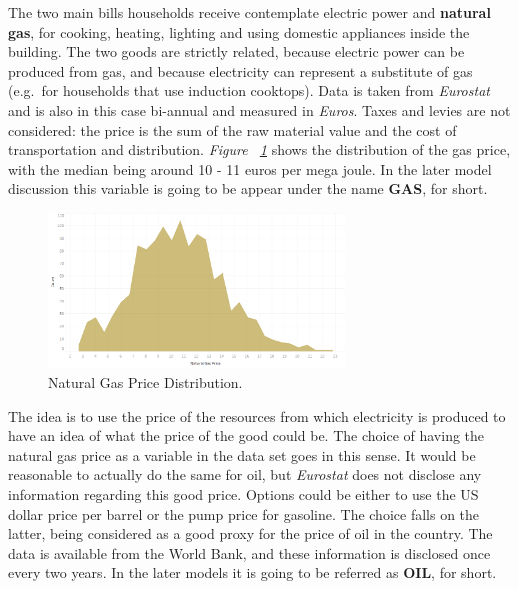 \documentclass[a4paper,12pt]{book}
\begin{document}
The two main bills households receive contemplate electric power and \textbf{natural gas}, for cooking, heating, lighting and using domestic appliances inside the building. The two goods are strictly related, because electric power can be produced from gas, and because electricity can represent a substitute of gas (e.g.\ for households that use induction cooktops). Data is taken from \textit{Eurostat} and is also in this case bi-annual and measured in \textit{Euros}. Taxes and levies are not considered: the price is the sum of the raw material value and the cost of transportation and distribution. \textit{Figure ~\ref{fig:ngpd}} shows the distribution of the gas price, with the median being around 10 - 11 euros per mega joule. In the later model discussion this variable is going to be appear under the name \textbf{GAS}, for short.

\begin{figure}[tb]
\begin{center}
\captionsetup{justification=centering}
\includegraphics[width=0.7\textwidth]{Images/nGas.png}
\caption{Natural Gas Price Distribution.}
\label{fig:ngpd}
\end{center}
\end{figure}

The idea is to use the price of the resources from which electricity is produced to have an idea of what the price of the good could be. The choice of having the natural gas price as a variable in the data set goes in this sense. It would be reasonable to actually do the same for oil, but \textit{Eurostat} does not disclose any information regarding this good price. Options could be either to use the US dollar price per barrel or the pump price for gasoline. The choice falls on the latter, being considered as a good proxy for the price of oil in the country. The data is available from the World Bank, and these information is disclosed once every two years. In the later models it is going to be referred as \textbf{OIL}, for short.
\end{document}
